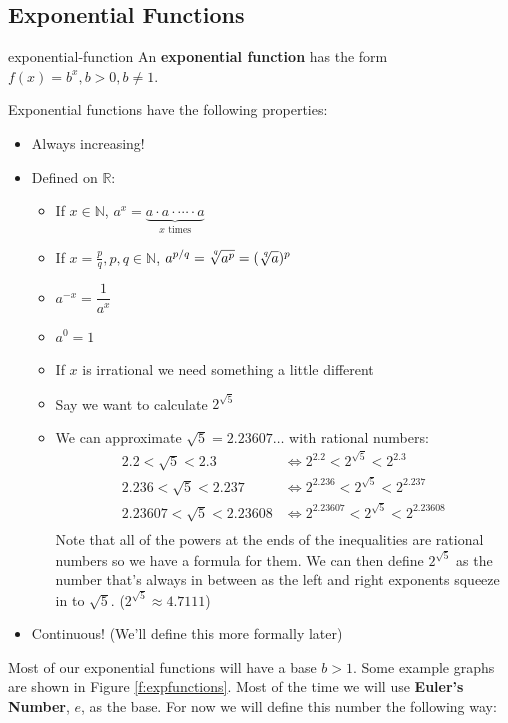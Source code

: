 \documentclass[letterpaper, 11pt, openany]{book}
\theoremstyle{mytheoremstyle}
\theoremstyle{myexamplestyle}
\begin{document}
\subsection{Exponential Functions}
\begin{definition}{}{exponential-function}
    An \textbf{exponential function} has the form $f(x) = b^{x}, b > 0, b \neq 1$.
\end{definition}
Exponential functions have the following properties:
\begin{itemize}
    \item Always increasing!
    \item Defined on $\mathbb{R}$:
    \begin{itemize}
        \item If $x \in \mathbb{N}$, $a^{x} = \underbrace{a \cdot a \cdot \cdots \cdot a}_{x \text{ times}}$
        \item If $x = \frac{p}{q}, p,q \in \mathbb{N}$, $a^{p/q} = \sqrt[\leftroot{-1} \uproot{3} q]{a^{p}} = (\sqrt[\leftroot{-1} \uproot{3} q]{a})^{p}$
        \item $a^{-x} = \dfrac{1}{a^{x}}$
        \item $a^{0} = 1$
        \item If $x$ is irrational we need something a little different
        \item Say we want to calculate $2^{\sqrt{5}}$
        \item We can approximate $\sqrt{5} = 2.23607\ldots$ with rational numbers:
        \begin{align*}
            2.2 < \sqrt{5} < 2.3    &\Leftrightarrow 2^{2.2} < 2^{\sqrt{5}} < 2^{2.3}\\
            2.236 < \sqrt{5} < 2.237    &\Leftrightarrow 2^{2.236} < 2^{\sqrt{5}} < 2^{2.237}\\
            2.23607 < \sqrt{5} < 2.23608    &\Leftrightarrow 2^{2.23607} < 2^{\sqrt{5}} < 2^{2.23608}\\ 
        \end{align*}
        Note that all of the powers at the ends of the inequalities are rational numbers so we have a formula for them. We can then define $2^{\sqrt{5}}$ as the number that's always in between as the left and right exponents squeeze in to $\sqrt{5}$. ($2^{\sqrt{5}} \approx 4.7111$)
    \end{itemize}
    \item Continuous! (We'll define this more formally later)
\end{itemize}
Most of our exponential functions will have a base $b > 1$. Some example graphs are shown in Figure \ref{f:expfunctions}. Most of the time we will use \textbf{Euler's Number}, $e$, as the base. For now we will define this number the following way:
\end{document}
